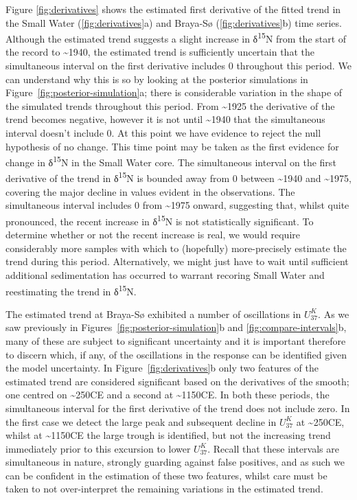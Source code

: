 \documentclass[12pt,]{article}
\newcommand{\uk}{\ensuremath{\mathit{U}^{\mathit{K}}_{\mathup{37}}}}
\begin{document}
Figure \ref{fig:derivatives} shows the estimated first derivative of the
fitted trend in the Small Water (\ref{fig:derivatives}a) and Braya-Sø
(\ref{fig:derivatives}b) time series. Although the estimated trend
suggests a slight increase in δ\textsuperscript{15}N from the start of
the record to \textasciitilde{}1940, the estimated trend is sufficiently
uncertain that the simultaneous interval on the first derivative
includes 0 throughout this period. We can understand why this is so by
looking at the posterior simulations in
Figure~\ref{fig:posterior-simulation}a; there is considerable variation
in the shape of the simulated trends throughout this period. From
\textasciitilde{}1925 the derivative of the trend becomes negative,
however it is not until \textasciitilde{}1940 that the simultaneous
interval doesn't include \(0\). At this point we have evidence to reject
the null hypothesis of no change. This time point may be taken as the
first evidence for change in δ\textsuperscript{15}N in the Small Water
core. The simultaneous interval on the first derivative of the trend in
δ\textsuperscript{15}N is bounded away from \(0\) between
\textasciitilde{}1940 and \textasciitilde{}1975, covering the major
decline in values evident in the observations. The simultaneous interval
includes \(0\) from \textasciitilde{}1975 onward, suggesting that,
whilst quite pronounced, the recent increase in δ\textsuperscript{15}N
is not statistically significant. To determine whether or not the recent
increase is real, we would require considerably more samples with which
to (hopefully) more-precisely estimate the trend during this period.
Alternatively, we might just have to wait until sufficient additional
sedimentation has occurred to warrant recoring Small Water and
reestimating the trend in δ\textsuperscript{15}N.

The estimated trend at Braya-Sø exhibited a number of oscillations in
\uk{}. As we saw previously in Figures~\ref{fig:posterior-simulation}b
and \ref{fig:compare-intervals}b, many of these are subject to
significant uncertainty and it is important therefore to discern which,
if any, of the oscillations in the response can be identified given the
model uncertainty. In Figure~\ref{fig:derivatives}b only two features of
the estimated trend are considered significant based on the derivatives
of the smooth; one centred on \textasciitilde{}250CE and a second at
\textasciitilde{}1150CE. In both these periods, the simultaneous
interval for the first derivative of the trend does not include zero. In
the first case we detect the large peak and subsequent decline in \uk{}
at \textasciitilde{}250CE, whilst at \textasciitilde{}1150CE the large
trough is identified, but not the increasing trend immediately prior to
this excursion to lower \uk. Recall that these intervals are
simultaneous in nature, strongly guarding against false positives, and
as such we can be confident in the estimation of these two features,
whilst care must be taken to not over-interpret the remaining variations
in the estimated trend.
\end{document}
